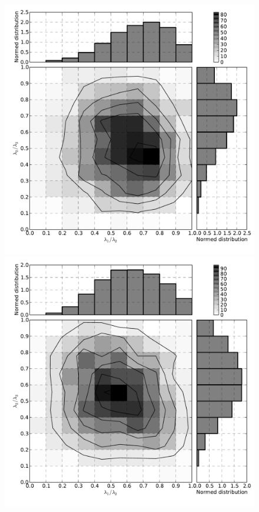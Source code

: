 \documentclass[usenatbib]{latex/mn2e}
\begin{document}
\begin{flushleft}
\begin{figure}
\begin{center}
  \includegraphics[trim = 7mm 10mm 1mm 0mm, clip, keepaspectratio=true,
  width=0.36\textheight]{./figures/voids_inertia_tensor_Tweb}
  \includegraphics[trim = 7mm 10mm 1mm 0mm, clip, keepaspectratio=true,
  width=0.36\textheight]{./figures/voids_inertia_tensor_Vweb}


  \label{fig:distro_inertia}
  \vspace{0.1 cm}

\end{center}
\end{figure}
\end{flushleft}
\end{document}
